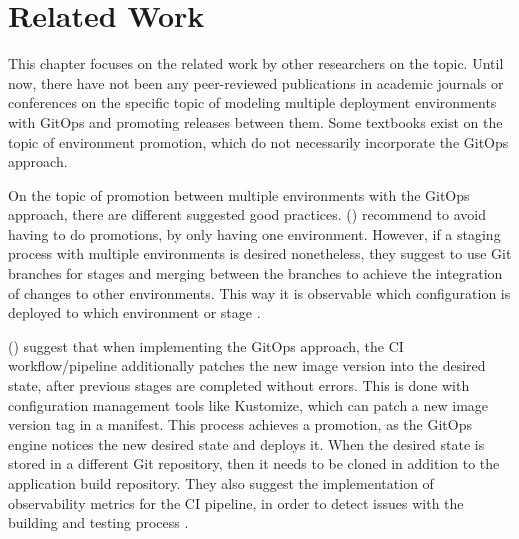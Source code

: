 
\chapter{Related Work}
\label{related-work}


This chapter focuses on the related work by other researchers on the topic.
Until now, there have not been any peer-reviewed publications
in academic journals or conferences
on the specific topic of
modeling multiple deployment environments with GitOps and promoting releases between them.
Some textbooks exist on the topic of environment promotion, which
do not necessarily incorporate the GitOps approach.



On the topic of promotion between multiple environments
with the GitOps approach,
there are different suggested good practices.
\citeauthor{gitopsCloudnativeCDInnoq} (\citeyear{gitopsCloudnativeCDInnoq})
recommend to avoid having to do promotions,
by only having one environment.
However, if a staging process with multiple environments is desired
nonetheless, they suggest to use Git branches for stages and merging
between the branches to achieve the integration of changes to other environments.
This way it is observable which configuration is deployed to which environment or stage \autocite{gitopsCloudnativeCDInnoq}.


\citeauthor{gitopsAndKubernetes2021continuous} (\citeyear{gitopsAndKubernetes2021continuous})
suggest that when implementing the GitOps approach,
the CI workflow/pipeline additionally patches the new image version into
the desired state,
after previous stages are completed without errors.
This is done with configuration management tools like Kustomize,
which can patch a new image version tag in a manifest.
This process achieves a promotion, as the GitOps engine notices the new desired state
and deploys it.
When the desired state is stored in a different Git repository,
then it needs to be cloned in addition to the application build repository.
They
also suggest the implementation of observability metrics for the CI pipeline,
in order to detect issues with the building and testing process
\autocite{gitopsAndKubernetes2021continuous}.

